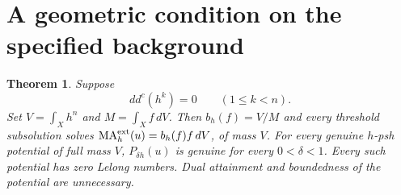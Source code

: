 \documentclass[11pt]{article}
\newcommand{\ddc}{dd^c}
\newcommand{\MA}{\operatorname{MA}}
\newcommand{\1}{\mathbf 1}
\newtheorem{theorem}{Theorem}
\theoremstyle{remark}\newtheorem{remark}[theorem]{Remark}
\begin{document}
\section{A geometric condition on the specified background}
\begin{theorem}\label{th:mass}
Suppose
\begin{equation}\label{eq:G}
 \ddc(h^k)=0\qquad(1\leq k<n).
\end{equation}
Set $V=\int_Xh^n$ and $M=\int_Xf\,dV$. Then $b_h(f)=V/M$ and every
threshold subsolution solves $\MA_h^{\rm ext}(u)=b_h(f)f\,dV$, of mass $V$.
For every genuine $h$-psh potential of full mass $V$,
$P_{\delta h}(u)$ is genuine for every $0<\delta<1$.
Every such potential has zero Lelong numbers.
Dual attainment and boundedness of the potential are unnecessary.
\end{theorem}
\end{document}
